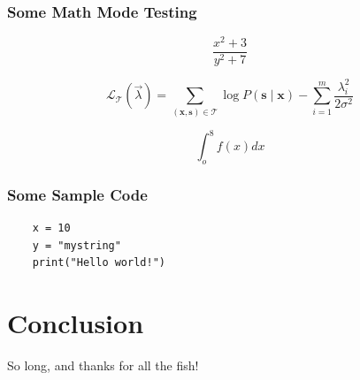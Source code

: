 \documentclass{beamer}
\begin{document}
\begin{frame}
  \frametitle{Some Math Mode Testing}
  $$\frac{x^2+3}{y^2+7}$$

  \[
    \mathcal L_{\mathcal T}(\vec{\lambda})
    = \sum_{(\mathbf{x},\mathbf{s})\in \mathcal T}
       \log P(\mathbf{s}\mid\mathbf{x}) - \sum_{i=1}^m
       \frac{\lambda_i^2}{2\sigma^2}
  \]

  $$\int_o^8 f(x) dx$$
\end{frame}

\begin{frame}[fragile]
  \frametitle{Some Sample Code}

  \begin{verbatim}
    x = 10
    y = "mystring"
    print("Hello world!")
  \end{verbatim}

\end{frame}


\section{Conclusion}
\frame{\sectionpage}

\begin{frame}
  \begin{center}
    {\color{sigpwny@maingreen} So long, and thanks for all the fish!}
  \end{center}
\end{frame}
\end{document}
